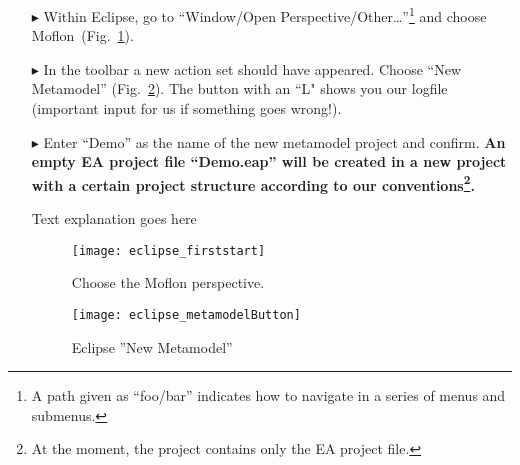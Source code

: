 \visHeader

\begin{enumerate}
\item[$\blacktriangleright$] Within Eclipse, go to ``Window/Open Perspective/Other\ldots''\footnote{A path given as ``foo/bar'' indicates how to navigate in a series of menus and submenus.} and choose Moflon~(Fig.~\ref{fig_eclipse}). 

\item[$\blacktriangleright$] In the toolbar a new action set should have appeared. Choose ``New Metamodel'' (Fig.~\ref{fig_eclipseNewMetamodel}).
The button with an ``L" shows you our logfile (important input for us if something goes wrong!).
 
\item[$\blacktriangleright$] Enter ``Demo'' as the name of the new metamodel project and confirm. 
{\bf An empty EA project file ``Demo.eap'' will be created in a new project with a certain project structure according to our conventions\footnote{At the moment, the project contains only the EA project file.}.}

\newpage
\texHeader
Text explanation goes here
\pagebreak


\visHeader

\begin{figure}[htbp]
	\centering
  \texttt{[image: eclipse\_firststart]}
	\caption{Choose the Moflon perspective.}
	\label{fig_eclipse}
\end{figure}

\vspace{1cm}

\begin{figure}[htbp]
	\centering
  \texttt{[image: eclipse\_metamodelButton]}
	\caption{Eclipse ''New Metamodel''}
	\label{fig_eclipseNewMetamodel}
\end{figure}


\end{enumerate}
